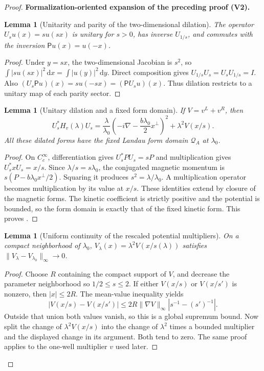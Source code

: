 \documentclass[11pt]{article}
\newtheorem{lemma}[theorem]{Lemma}
\newcommand{\formalisationparentid}{X}
\newenvironment{formalisationaddition}[1]{\par\medskip\begingroup\color{blue}\def\formalisationparentid{#1}\setcounter{formalizationsublemma}{0}\let\lemma\formalizationsublemma\let\endlemma\endformalizationsublemma
  \def\Eo{\mathcal E_h^\circ}\def\EE{\mathcal E_h}\def\phio{\phi_h^\circ}\def\phih{\phi_h}\def\Ho{H_h^{\rm atom}(v^\circ)}\def\Ha{H_h^{\rm atom}}\def\HL{H_h^{L}}\def\Dh{D_h}\def\Log{\operatorname{Log}}\def\ellh{\ell_h}\def\Gp{G_{p,h}}\def\Ast{A_{*,h}}\def\ahat{\widehat{\mathfrak a}_h}\def\ah{\mathfrak a_h}\def\rh{\widehat\rho_h}\def\deltah{\widehat\delta_h}\def\oldref##1{\textup{(##1)}}\def\interface##1{\par\noindent\textit{Analytical interface used here.} ##1\par}\def\finish{\par\noindent\textit{Conclusion of the formalization-oriented expansion.} }\par\noindent\textbf{Formalization-oriented expansion of the preceding proof (V2).}\par\smallskip
}{\par\endgroup\medskip
}
\begin{document}
\begin{proof}
\begin{formalisationaddition}{L8.6}
\begin{lemma}[Unitarity and parity of the two-dimensional dilation]\label{sublemma:L8-6-unitary-dilation}
The operator $U_su(x)=su(sx)$ is unitary for $s>0$, has inverse $U_{1/s}$,
and commutes with the inversion $\mathsf Pu(x)=u(-x)$.
\end{lemma}
\begin{proof}
Under $y=sx$, the two-dimensional Jacobian is $s^2$, so
$\int|su(sx)|^2\,\mathrm dx=\int|u(y)|^2\,\mathrm dy$.
Direct composition gives $U_{1/s}U_s=U_sU_{1/s}=I$.
Also $(U_s\mathsf Pu)(x)=su(-sx)=(\mathsf PU_su)(x)$.
Thus dilation restricts to a unitary map of each parity sector.
\end{proof}

\begin{lemma}[Unitary dilation and a fixed form domain]\label{sublemma:L8-6-dilation}
If $V=v^L+v^R$, then
\[
 U_s^*H_v(\lambda)U_s
 =\frac\lambda{\lambda_0}
     \left(-i\nabla-\frac{b\lambda_0}{2}x^\perp\right)^2
       +\lambda^2V(x/s).
\]
All these dilated forms have the fixed Landau form domain
$\mathcal Q_A$ at $\lambda_0$.
\end{lemma}
\begin{proof}
On $C_c^\infty$, differentiation gives $U_s^*PU_s=sP$ and
multiplication gives $U_s^*xU_s=x/s$.
Since $\lambda/s=s\lambda_0$, the conjugated magnetic momentum is
$s(P-b\lambda_0x^\perp/2)$. Squaring it produces
$s^2=\lambda/\lambda_0$. A multiplication operator becomes
multiplication by its value at $x/s$. These identities extend by
closure of the magnetic forms. The kinetic coefficient is strictly
positive and the potential is bounded, so the form domain is exactly
that of the fixed kinetic form. This proves .
\end{proof}

\begin{lemma}[Uniform continuity of the rescaled potential multipliers]\label{sublemma:L8-6-multiplier-continuity}
On a compact neighborhood of $\lambda_0$,
$V_\lambda(x)=\lambda^2V(x/s(\lambda))$ satisfies
$\|V_\lambda-V_{\lambda_0}\|_\infty\to0$.
\end{lemma}
\begin{proof}
Choose $R$ containing the compact support of $V$, and decrease the
parameter neighborhood so $1/2\le s\le2$.
If either $V(x/s)$ or $V(x/s')$ is nonzero, then $|x|\le2R$.
The mean-value inequality yields
\[
 |V(x/s)-V(x/s')|
 \le2R\|\nabla V\|_\infty|s^{-1}-(s')^{-1}|.
\]
Outside that union both values vanish, so this is a global supremum
bound. Now split the change of $\lambda^2V(x/s)$ into the change of
$\lambda^2$ times a bounded multiplier and the displayed change in
its argument. Both tend to zero. The same proof applies to the
one-well multiplier $v$ used later.
\end{proof}


\end{formalisationaddition}
\end{proof}
\end{document}
